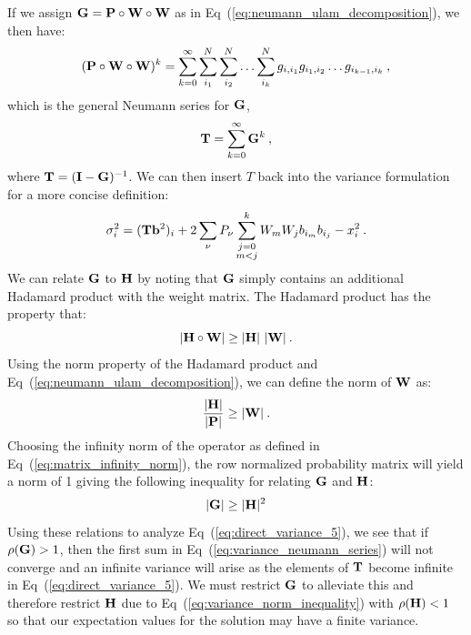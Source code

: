 If we assign $\mathbf{G} = \mathbf{P} \circ \mathbf{W} \circ \mathbf{W}$ as in
Eq~(\ref{eq:neumann_ulam_decomposition}), we then have:
\begin{equation}
   (\mathbf{P} \circ \mathbf{W} \circ \mathbf{W})^k =
  \sum_{k=0}^{\infty}\sum_{i_1}^{N}\sum_{i_2}^{N}\ldots
  \sum_{i_k}^{N}g_{i,i_1}g_{i_1,i_2}\ldots g_{i_{k-1},i_k}\:,
  \label{eq:direct_variance_6}
\end{equation}
which is the general Neumann series for $\mathbf{G}$,
\begin{equation}
  \mathbf{T} = \sum_{k=0}^{\infty} \mathbf{G}^k\:,
  \label{eq:variance_neumann_series}
\end{equation}
where $\mathbf{T} = (\mathbf{I}-\mathbf{G})^{-1}$. We can then insert $T$ back
into the variance formulation for a more concise definition:
\begin{equation}
  \sigma^2_i = (\mathbf{T}\mathbf{b}^2)_i + 2 \sum_{\nu} P_{\nu}
  \sum_{\substack{ j=0 \\ m<j}}^k W_m W_j b_{i_m} b_{i_j} - x_i^2\:.
  \label{eq:direct_variance_5}
\end{equation}
We can relate $\mathbf{G}$ to $\mathbf{H}$ by noting that $\mathbf{G}$ simply
contains an additional Hadamard product with the weight matrix. The
Hadamard product has the property that:
\begin{equation}
  |\mathbf{H} \circ \mathbf{W}| \geq |\mathbf{H}|\ |\mathbf{W}|\:.
  \label{eq:hadamard_inequality}
\end{equation}
Using the norm property of the Hadamard product and
Eq~(\ref{eq:neumann_ulam_decomposition}), we can define the norm of
$\mathbf{W}$ as:
\begin{equation}
  \frac{|\mathbf{H}|}{|\mathbf{P}|} \geq |\mathbf{W}|\:.
  \label{eq:weight_norm}
\end{equation}
Choosing the infinity norm of the operator as defined in
Eq~(\ref{eq:matrix_infinity_norm}), the row normalized probability
matrix will yield a norm of 1 giving the following inequality for
relating $\mathbf{G}$ and $\mathbf{H}$:
\begin{equation}
  |\mathbf{G}| \geq |\mathbf{H}|^2
  \label{eq:variance_norm_inequality}
\end{equation}
Using these relations to analyze Eq~(\ref{eq:direct_variance_5}), we
see that if $\rho(\mathbf{G}) > 1$, then the first sum in
Eq~(\ref{eq:variance_neumann_series}) will not converge and an
infinite variance will arise as the elements of $\mathbf{T}$ become
infinite in Eq~(\ref{eq:direct_variance_5}). We must restrict $\mathbf{G}$
to alleviate this and therefore restrict $\mathbf{H}$ due to
Eq~(\ref{eq:variance_norm_inequality}) with $\rho(\mathbf{H}) < 1$ so that
our expectation values for the solution may have a finite variance.

